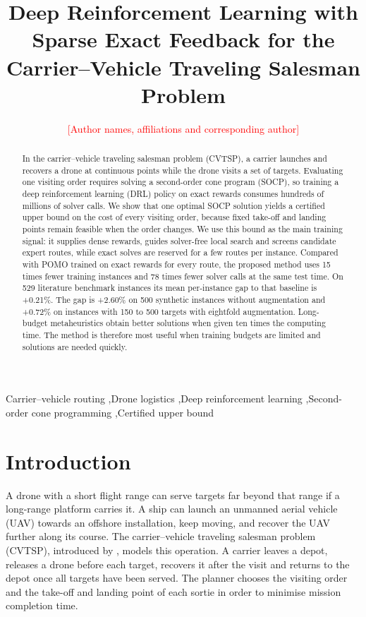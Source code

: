 \documentclass[preprint,12pt,authoryear]{elsarticle}
\newcommand{\placeholder}[1]{\textcolor{red}{[#1]}}
\begin{document}
\begin{frontmatter}

\title{Deep Reinforcement Learning with Sparse Exact Feedback for the Carrier--Vehicle Traveling Salesman Problem}

\author{\placeholder{Author names, affiliations and corresponding author}}

\begin{abstract}
In the carrier--vehicle traveling salesman problem (CVTSP), a carrier launches and recovers a drone at continuous points while the drone visits a set of targets. Evaluating one visiting order requires solving a second-order cone program (SOCP), so training a deep reinforcement learning (DRL) policy on exact rewards consumes hundreds of millions of solver calls. We show that one optimal SOCP solution yields a certified upper bound on the cost of every visiting order, because fixed take-off and landing points remain feasible when the order changes. We use this bound as the main training signal: it supplies dense rewards, guides solver-free local search and screens candidate expert routes, while exact solves are reserved for a few routes per instance. Compared with POMO trained on exact rewards for every route, the proposed method uses 15 times fewer training instances and 78 times fewer solver calls at the same test time. On 529 literature benchmark instances its mean per-instance gap to that baseline is +0.21\%. The gap is +2.60\% on 500 synthetic instances without augmentation and +0.72\% on instances with 150 to 500 targets with eightfold augmentation. Long-budget metaheuristics obtain better solutions when given ten times the computing time. The method is therefore most useful when training budgets are limited and solutions are needed quickly.
\end{abstract}

\begin{keyword}
Carrier--vehicle routing \sep Drone logistics \sep Deep reinforcement learning \sep Second-order cone programming \sep Certified upper bound
\end{keyword}

\end{frontmatter}

\section{Introduction}
\label{sec:intro}

A drone with a short flight range can serve targets far beyond that range if a long-range platform carries it. A ship can launch an unmanned aerial vehicle (UAV) towards an offshore installation, keep moving, and recover the UAV further along its course. The carrier--vehicle traveling salesman problem (CVTSP), introduced by \citet{garone2011}, models this operation. A carrier leaves a depot, releases a drone before each target, recovers it after the visit and returns to the depot once all targets have been served. The planner chooses the visiting order and the take-off and landing point of each sortie in order to minimise mission completion time.
\end{document}
